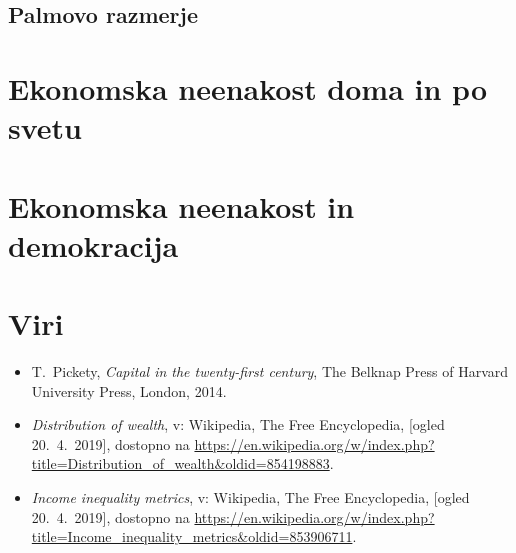 \documentclass[a4paper,12 pt]{article}
\begin{document}
\subsection[Palmovo razmerje]{Palmovo razmerje}

\newpage

\section[Ekonomska neenakost doma in po svetu]{Ekonomska neenakost doma in po svetu}

\newpage

\section[Ekonomska neenakost in demokracija]{Ekonomska neenakost in demokracija}

\newpage

\section[Viri]{Viri}

\begin{itemize}
\item
\label{Pickety}
T.~Pickety, \emph{Capital in the twenty-first century}, The Belknap Press of Harvard University Press, London, 2014.

\item 
\label{Razdelitev premoženja}
\emph{Distribution of wealth}, v: Wikipedia, The Free Encyclopedia, [ogled 20.~4.~2019], dostopno na \url{https://en.wikipedia.org/w/index.php?title=Distribution_of_wealth&oldid=854198883}.

\item 
\label{Metrike ekonomske neenakosti}
\emph{Income inequality metrics}, v: Wikipedia, The Free Encyclopedia, [ogled 20.~4.~2019], dostopno na \url{https://en.wikipedia.org/w/index.php?title=Income_inequality_metrics&oldid=853906711}.
\end{itemize}
\end{document}
